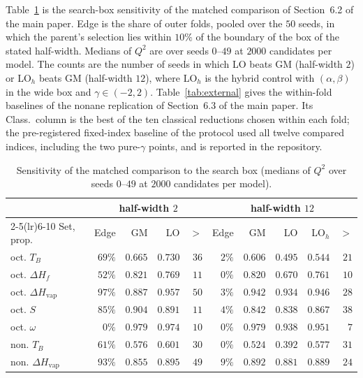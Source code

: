 \documentclass[a5paper, 10pt]{article}
\theoremstyle{plain}
\theoremstyle{remark}
\theoremstyle{definition}
\begin{document}
Table~\ref{tab:box} is the search-box sensitivity of the matched
comparison of Section~6.2 of the main paper. Edge is the share of outer
folds, pooled over the $50$ seeds, in which the parent's selection lies
within $10\%$ of the boundary of the box of the stated half-width.
Medians of $Q^2$ are over seeds $0$--$49$ at $2000$ candidates per
model. The counts are the number of seeds in which LO beats GM
(half-width $2$) or LO$_h$ beats GM (half-width $12$), where LO$_h$ is
the hybrid control with $(\alpha,\beta)$ in the wide box and
$\gamma \in (-2,2)$. Table~\ref{tab:external} gives the within-fold
baselines of the nonane replication of Section~6.3 of the main paper. Its
Class.\ column is the best of the ten classical reductions chosen within
each fold; the pre-registered fixed-index baseline of the protocol used
all twelve compared indices, including the two pure-$\gamma$ points,
and is reported in the repository.

\begin{table}[htbp]
\centering
\caption{Sensitivity of the matched comparison to the search box (medians of $Q^2$ over seeds $0$--$49$ at $2000$ candidates per model).}
\label{tab:box}
\small
\setlength{\tabcolsep}{1.6pt}
\begin{tabular}{lrrrrrrrrr}
\toprule
 & \multicolumn{4}{c}{half-width $2$} & \multicolumn{5}{c}{half-width $12$}\\
\cmidrule(lr){2-5}\cmidrule(lr){6-10}
Set, prop. & Edge & GM & LO & $>$ & Edge & GM & LO & LO$_h$ & $>$\\
\midrule
oct. $T_B$ & $69\%$ & $0.665$ & $0.730$ & $36$ & $2\%$ & $0.606$ & $0.495$ & $0.544$ & $21$\\
oct. $\Delta H_f$ & $52\%$ & $0.821$ & $0.769$ & $11$ & $0\%$ & $0.820$ & $0.670$ & $0.761$ & $10$\\
oct. $\Delta H_{\mathrm{vap}}$ & $97\%$ & $0.887$ & $0.957$ & $50$ & $3\%$ & $0.942$ & $0.934$ & $0.946$ & $28$\\
oct. $S$ & $85\%$ & $0.904$ & $0.891$ & $11$ & $4\%$ & $0.842$ & $0.838$ & $0.867$ & $38$\\
oct. $\omega$ & $0\%$ & $0.979$ & $0.974$ & $10$ & $0\%$ & $0.979$ & $0.938$ & $0.951$ & $7$\\
non. $T_B$ & $61\%$ & $0.576$ & $0.601$ & $30$ & $0\%$ & $0.524$ & $0.392$ & $0.577$ & $31$\\
non. $\Delta H_{\mathrm{vap}}$ & $93\%$ & $0.855$ & $0.895$ & $49$ & $9\%$ & $0.892$ & $0.881$ & $0.889$ & $24$\\
\bottomrule
\end{tabular}
\end{table}
\end{document}
